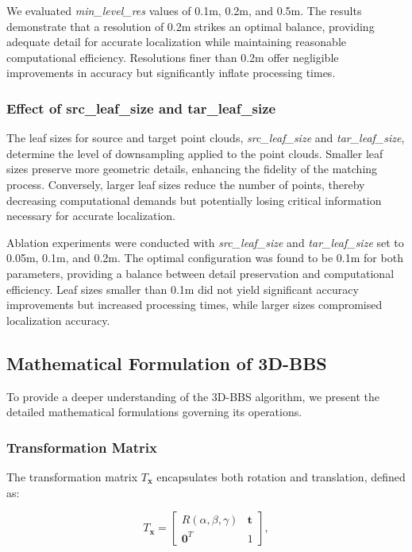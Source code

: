 We evaluated \textit{min\_level\_res} values of 0.1m, 0.2m, and 0.5m. The results demonstrate that a resolution of 0.2m strikes an optimal balance, providing adequate detail for accurate localization while maintaining reasonable computational efficiency. Resolutions finer than 0.2m offer negligible improvements in accuracy but significantly inflate processing times.

\subsubsection{Effect of src\_leaf\_size and tar\_leaf\_size}
The leaf sizes for source and target point clouds, \textit{src\_leaf\_size} and \textit{tar\_leaf\_size}, determine the level of downsampling applied to the point clouds. Smaller leaf sizes preserve more geometric details, enhancing the fidelity of the matching process. Conversely, larger leaf sizes reduce the number of points, thereby decreasing computational demands but potentially losing critical information necessary for accurate localization.

Ablation experiments were conducted with \textit{src\_leaf\_size} and \textit{tar\_leaf\_size} set to 0.05m, 0.1m, and 0.2m. The optimal configuration was found to be 0.1m for both parameters, providing a balance between detail preservation and computational efficiency. Leaf sizes smaller than 0.1m did not yield significant accuracy improvements but increased processing times, while larger sizes compromised localization accuracy.

\subsection{Mathematical Formulation of 3D-BBS}
To provide a deeper understanding of the 3D-BBS algorithm, we present the detailed mathematical formulations governing its operations.

\subsubsection{Transformation Matrix}
The transformation matrix $T_{\mathbf{x}}$ encapsulates both rotation and translation, defined as:

\begin{equation*}
T_{\mathbf{x}} = \begin{bmatrix}
R(\alpha, \beta, \gamma) & \mathbf{t} \\
\mathbf{0}^T & 1
\end{bmatrix},
\end{equation*}

